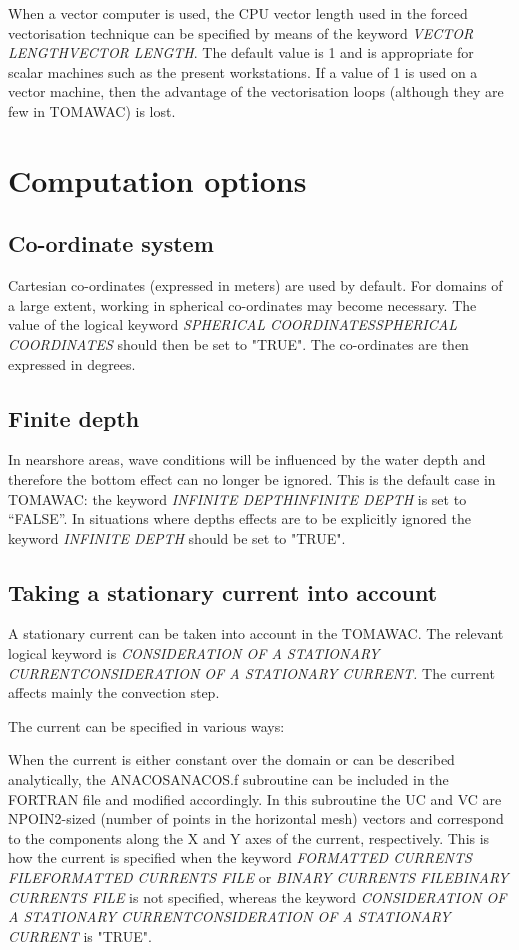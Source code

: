  When a vector computer is used, the CPU vector length used in the forced vectorisation technique can be specified by means of the keyword \textit{VECTOR LENGTHVECTOR LENGTH}. The default value is 1 and is appropriate for scalar machines such as the present workstations. If a value of 1 is used on a vector machine, then the advantage of the vectorisation loops (although they are few in TOMAWAC) is lost.


\section{ Computation options}


\subsection{ Co-ordinate system}

 Cartesian co-ordinates (expressed in meters) are used by default. For domains of a large extent, working in spherical co-ordinates may become necessary. The value of the logical keyword \textit{SPHERICAL COORDINATESSPHERICAL COORDINATES} should then be set to "TRUE". The co-ordinates are then expressed in degrees.


\subsection{ Finite depth }

 In nearshore areas, wave conditions will be influenced by the water depth and therefore the bottom effect can no longer be ignored. This is the default case in TOMAWAC: the keyword \textit{INFINITE DEPTHINFINITE DEPTH }is set to ``FALSE''. In situations where depths effects are to be explicitly ignored the keyword \textit{INFINITE DEPTH} should be set to "TRUE".


\subsection{ Taking a stationary current into account}

 A stationary current can be taken into account in the TOMAWAC. The relevant logical keyword is \textit{CONSIDERATION OF A STATIONARY CURRENTCONSIDERATION OF A STATIONARY CURRENT. }The current affects mainly the convection step.

 The current can be specified in various ways:

 When the current is either constant over the domain or can be described analytically, the ANACOSANACOS.f subroutine can be included in the FORTRAN file and modified accordingly. In this subroutine the UC and VC are NPOIN2-sized (number of points in the horizontal mesh) vectors and correspond to the components along the X and Y axes of the current, respectively. This is how the current is specified when the keyword \textit{FORMATTED CURRENTS FILEFORMATTED CURRENTS FILE} or \textit{BINARY CURRENTS FILEBINARY CURRENTS FILE }is not specified, whereas the keyword \textit{CONSIDERATION OF A STATIONARY CURRENTCONSIDERATION OF A STATIONARY CURRENT} is "TRUE".

